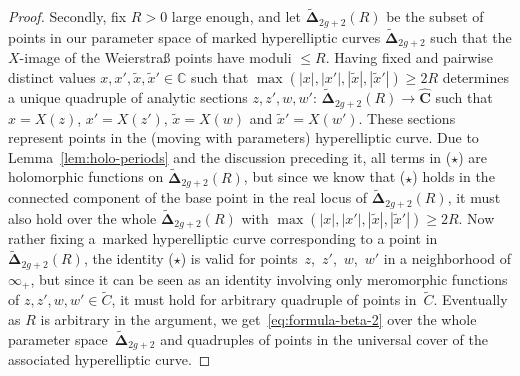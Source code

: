 \documentclass[pdftex]{sigma}
\numberwithin{equation}{section}
\begin{document}
\begin{proof}
Secondly, fix $R > 0$ large enough, and let $\widetilde{\bm{\Delta}}_{2g + 2}(R)$ be the subset of points in our para\-meter space of marked hyperelliptic curves $\widetilde{\bm{\Delta}}_{2g + 2}$ such that the $X$-image of the Weierstra\ss{} points have moduli $\leq R$. Having fixed and pairwise distinct values $x,x',\tilde{x},\tilde{x}' \in \mathbb{C}$ such that $\max(|x|,|x'|,|\tilde{x}|,|\tilde{x}'|) \geq 2R$ determines a unique quadruple of analytic sections $z,z',w,w'$: $\widetilde{\bm{\Delta}}_{2g + 2}(R) \rightarrow \hat{\bm{C}}$ such that $x = X(z)$, $x' = X(z')$, $\tilde{x} = X(w)$ and $\tilde{x}' = X(w')$. These sections represent points in the (moving with parameters) hyperelliptic curve. Due to Lemma~\ref{lem:holo-periods} and the discussion preceding it, all terms in ($\star$) are holomorphic functions on $\widetilde{\bm{\Delta}}_{2g + 2}(R)$, but since we know that ($\star$) holds in the connected component of the base point in the real locus of $\widetilde{\bm{\Delta}}_{2g + 2}(R)$, it must also hold over the whole $\widetilde{\bm{\Delta}}_{2g + 2}(R)$ with $\max(|x|,|x'|,|\tilde{x}|,|\tilde{x}'|) \geq 2R$. Now rather fixing a~marked hyperelliptic curve corresponding to a point in $\widetilde{\bm{\Delta}}_{2g + 2}(R)$, the identity ($\star$) is valid for points~$z$,~$z'$,~$w$,~$w'$ in a neighborhood of $\infty_+$, but since it can be seen as an identity involving only meromorphic functions of $z,z',w,w' \in \widetilde{C}$, it must hold for arbitrary quadruple of points in~$\widetilde{C}$. Eventually as $R$ is arbitrary in the argument, we get~\eqref{eq:formula-beta-2} over the whole parameter space~$\widetilde{\bm{\Delta}}_{2g + 2}$ and quadruples of points in the universal cover of the associated hyperelliptic curve.
\end{proof}
\end{document}
